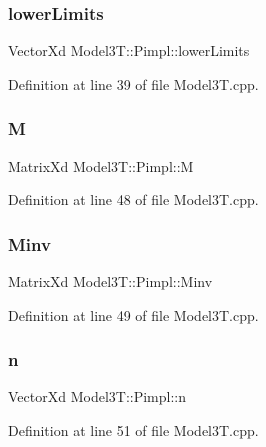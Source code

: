 \subsubsection{\texorpdfstring{lower\+Limits}{lowerLimits}}
{\footnotesize\ttfamily Vector\+Xd Model3\+T\+::\+Pimpl\+::lower\+Limits}



Definition at line 39 of file Model3\+T.\+cpp.

\hypertarget{structModel3T_1_1Pimpl_a2756947646bc2a7485760f1599011764}{}\label{structModel3T_1_1Pimpl_a2756947646bc2a7485760f1599011764} 
\subsubsection{\texorpdfstring{M}{M}}
{\footnotesize\ttfamily Matrix\+Xd Model3\+T\+::\+Pimpl\+::M}



Definition at line 48 of file Model3\+T.\+cpp.

\hypertarget{structModel3T_1_1Pimpl_a6e50170f8b2b58e1e7a91244ffe1691c}{}\label{structModel3T_1_1Pimpl_a6e50170f8b2b58e1e7a91244ffe1691c} 
\subsubsection{\texorpdfstring{Minv}{Minv}}
{\footnotesize\ttfamily Matrix\+Xd Model3\+T\+::\+Pimpl\+::\+Minv}



Definition at line 49 of file Model3\+T.\+cpp.

\hypertarget{structModel3T_1_1Pimpl_a964360277690839fc358bb663a2cd949}{}\label{structModel3T_1_1Pimpl_a964360277690839fc358bb663a2cd949} 
\subsubsection{\texorpdfstring{n}{n}}
{\footnotesize\ttfamily Vector\+Xd Model3\+T\+::\+Pimpl\+::n}



Definition at line 51 of file Model3\+T.\+cpp.

\hypertarget{structModel3T_1_1Pimpl_aafa871718688ff6322cbfffed9ada401}{}\label{structModel3T_1_1Pimpl_aafa871718688ff6322cbfffed9ada401} 

